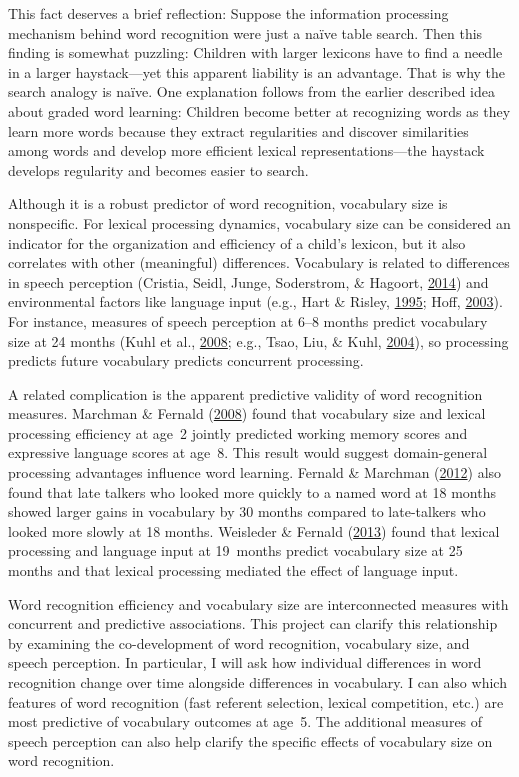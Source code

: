 \documentclass [11pt, proquest] {uwthesis}[2015/03/03]
\begin{document}
This fact deserves a brief reflection: Suppose the information
processing mechanism behind word recognition were just a naïve table
search. Then this finding is somewhat puzzling: Children with larger
lexicons have to find a needle in a larger haystack---yet this apparent
liability is an advantage. That is why the search analogy is naïve. One
explanation follows from the earlier described idea about graded word
learning: Children become better at recognizing words as they learn more
words because they extract regularities and discover similarities among
words and develop more efficient lexical representations---the haystack
develops regularity and becomes easier to search.

Although it is a robust predictor of word recognition, vocabulary size
is nonspecific. For lexical processing dynamics, vocabulary size can be
considered an indicator for the organization and efficiency of a child's
lexicon, but it also correlates with other (meaningful) differences.
Vocabulary is related to differences in speech perception (Cristia,
Seidl, Junge, Soderstrom, \& Hagoort,
\protect\hyperlink{ref-Cristia2014_Review}{2014}) and environmental
factors like language input (e.g., Hart \& Risley,
\protect\hyperlink{ref-HartRisley}{1995}; Hoff,
\protect\hyperlink{ref-Hoff2003}{2003}). For instance, measures of
speech perception at 6--8 months predict vocabulary size at 24 months
(Kuhl et al., \protect\hyperlink{ref-Kuhl2008}{2008}; e.g., Tsao, Liu,
\& Kuhl, \protect\hyperlink{ref-Tsao2004}{2004}), so processing predicts
future vocabulary predicts concurrent processing.

A related complication is the apparent predictive validity of word
recognition measures. Marchman \& Fernald
(\protect\hyperlink{ref-MarchmanFernald2008}{2008}) found that
vocabulary size and lexical processing efficiency at age~2 jointly
predicted working memory scores and expressive language scores at age~8.
This result would suggest domain-general processing advantages influence
word learning. Fernald \& Marchman
(\protect\hyperlink{ref-Fernald2012}{2012}) also found that late talkers
who looked more quickly to a named word at 18 months showed larger gains
in vocabulary by 30 months compared to late-talkers who looked more
slowly at 18 months. Weisleder \& Fernald
(\protect\hyperlink{ref-Weisleder2013}{2013}) found that lexical
processing and language input at 19~months predict vocabulary size at 25
months and that lexical processing mediated the effect of language
input.

Word recognition efficiency and vocabulary size are interconnected
measures with concurrent and predictive associations. This project can
clarify this relationship by examining the co-development of word
recognition, vocabulary size, and speech perception. In particular, I
will ask how individual differences in word recognition change over time
alongside differences in vocabulary. I can also which features of word
recognition (fast referent selection, lexical competition, etc.) are
most predictive of vocabulary outcomes at age~5. The additional measures
of speech perception can also help clarify the specific effects of
vocabulary size on word recognition.
\end{document}
